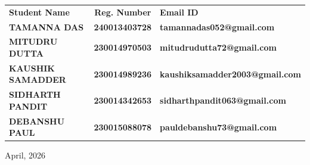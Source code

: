 

\begin{center}

    \vspace{5mm}






\begin{table}[H]
\centering
\renewcommand{\arraystretch}{1.4}
    \begin{tabular}{lcl}
    \textbf{Student Name} & \textbf{Reg. Number} & \textbf{Email ID}  \\ %

    \textbf{TAMANNA DAS} & \textbf{240013403728} & \textbf{tamannadas052@gmail.com} \\

    \textbf{MITUDRU DUTTA} & \textbf{230014970503} & \textbf{mitudrudutta72@gmail.com} \\

    \textbf{KAUSHIK SAMADDER} & \textbf{230014989236} & \textbf{kaushiksamadder2003@gmail.com} \\

    \textbf{SIDHARTH PANDIT} & \textbf{230014342653} & \textbf{sidharthpandit063@gmail.com} \\

    \textbf{DEBANSHU PAUL} & \textbf{230015088078} & \textbf{pauldebanshu73@gmail.com} \\
    \end{tabular}
\end{table}


 \vspace{2cm}


    \vspace{1cm}







    \universityDetailsTitlePage
    \vspace{-0.6cm}


    \begin{center}
    \vspace{0.2cm}
        {\Large April, 2026 \par}
    \end{center}


\end{center}
